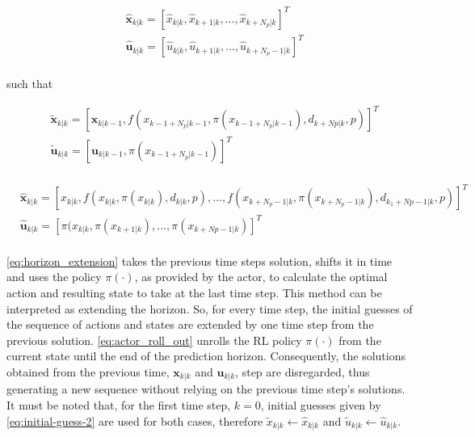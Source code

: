 \begin{equation}\label{eq:initial-guess-2}
	\begin{aligned}
		&\hat{\mathbf{x}}_{k|k} = [\hat{x}_{k|k},\hat{x}_{k+1|k},...,\hat{x}_{k + N_p|k}]^T \\ 
		&\hat{\mathbf{u}}_{k|k} = [\hat{u}_{k|k},\hat{u}_{k + 1|k},...,\hat{u}_{k + N_p - 1|k}]^T\\ 
	\end{aligned}
\end{equation}

such that

 \begin{equation}\label{eq:horizon_extension}
 	\begin{aligned}
 		&\tilde{\mathbf{x}}_{k|k} = [\mathbf{x}_{k|k-1},f(x_{k-1 + N_p|k-1}, \pi(x_{k-1 + N_p|k-1}), d_{k+Np|k},p)]^T\\ 
 		&\tilde{\mathbf{u}}_{k|k} = [\mathbf{u}_{k|k-1},\pi(x_{k-1 + N_p|k-1})]^T\\
 	\end{aligned}
 \end{equation}

\begin{equation}\label{eq:actor_roll_out}
	\begin{aligned}
		&\hat{\mathbf{x}}_{k|k} = [x_{k|k},f(x_{k|k},\pi(x_{k|k}),d_{k|k},p),..., f(x_{k+N_p-1|k}, \pi(x_{k + N_p-1|k}), d_{k_1 + Np-1|k},p)]^T \\ 
		&\hat{\mathbf{u}}_{k|k} = [\pi(x_{k|k},\pi(x_{k+1|k}),...,\pi(x_{k+Np-1|k})]^T \\ 
	\end{aligned}
	\end{equation}

\autoref{eq:horizon_extension} takes the previous time steps solution, shifts it in time and uses the policy $\pi(\cdot)$, as provided by the actor, to calculate the optimal action and resulting state to take at the last time step. This method can be interpreted as extending the horizon. So, for every time step, the initial guesses of the sequence of actions and states are extended by one time step from the previous solution. \autoref{eq:actor_roll_out} unrolls the RL policy $\pi(\cdot)$ from the current state until the end of the prediction horizon. Consequently, the solutions obtained from the previous time, $\mathbf{x}_{k|k}$ and $\mathbf{u}_{k|k}$, step are disregarded, thus generating a new sequence without relying on the previous time step’s solutions. It must be noted that, for the first time step, $k=0$, initial guesses given by \autoref{eq:initial-guess-2} are used for both cases, therefore $\tilde{x}_{k|k} \leftarrow \hat{x}_{k|k}$ and $\tilde{u}_{k|k} \leftarrow \hat{u}_{k|k}$.

